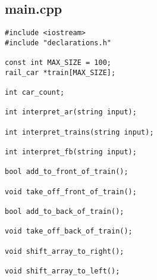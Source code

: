 \documentclass[11pt]{article}
\begin{document}
\newpage
\subsection*{main.cpp}
\begin{lstlisting}
#include <iostream>
#include "declarations.h"

const int MAX_SIZE = 100;
rail_car *train[MAX_SIZE];

int car_count;

int interpret_ar(string input);

int interpret_trains(string input);

int interpret_fb(string input);

bool add_to_front_of_train();

void take_off_front_of_train();

bool add_to_back_of_train();

void take_off_back_of_train();

void shift_array_to_right();

void shift_array_to_left();



\end{lstlisting}
\end{document}

